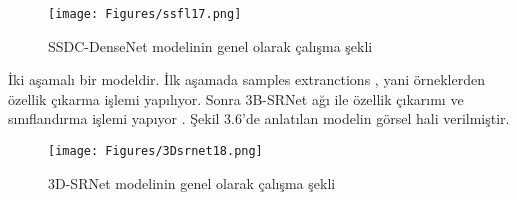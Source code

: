\begin{figure}[!ht]
  \centering
  \texttt{[image: Figures/ssfl17.png]}
  \caption{SSDC-DenseNet modelinin genel olarak çalışma şekli }
\end{figure}

\newpage
İki aşamalı bir modeldir. İlk aşamada samples extranctions , yani örneklerden özellik çıkarma işlemi yapılıyor. Sonra 3B-SRNet  ağı ile özellik çıkarımı ve sınıflandırma işlemi yapıyor \cite{jiang2019hyperspectral}. Şekil 3.6'de anlatılan modelin görsel hali verilmiştir. \\

\begin{figure}[!ht]
  \centering
  \texttt{[image: Figures/3Dsrnet18.png]}
  \caption{3D-SRNet modelinin genel olarak çalışma şekli }
\end{figure}















